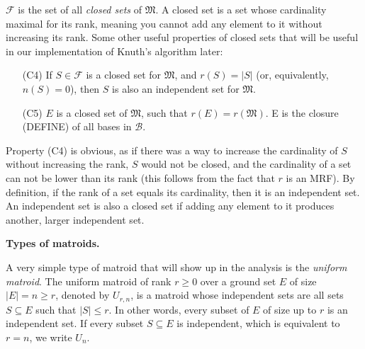 $\mathcal{F}$ is the set of all \textit{closed sets} of $\mathfrak{M}$. A closed set is a set whose cardinality maximal for its rank, meaning you cannot add any element to it without increasing its rank. Some other useful properties of closed sets that will be useful in our implementation of Knuth's algorithm later:

\begin{itemize}
  \item [(C4)] If $S \in \mathcal{F}$ is a closed set for $\mathfrak{M}$, and $r(S) = |S|$ (or, equivalently, $n(S) = 0$), then $S$ is also an independent set for $\mathfrak{M}$.
  \item [(C5)] $E$ is a closed set of $\mathfrak{M}$, such that $r(E) = r(\mathfrak{M})$. E is the closure (DEFINE) of all bases in $\mathcal{B}$.
\end{itemize}

Property (C4) is obvious, as if there was a way to increase the cardinality of $S$ without increasing the rank, $S$ would not be closed, and the cardinality of a set can not be lower than its rank (this follows from the fact that $r$ is an MRF). By definition, if the rank of a set equals its cardinality, then it is an independent set. An independent set is also a closed set if adding any element to it produces another, larger independent set.

\textbf{Types of matroids.} 

A very simple type of matroid that will show up in the analysis is the \textit{uniform matroid}. The uniform matroid of rank $r \geq 0$ over a ground set $E$ of size $|E| = n \geq r$, denoted by $U_{r, n}$, is a matroid whose independent sets are all sets $S \subseteq E$ such that $|S| \leq r$. In other words, every subset of $E$ of size up to $r$ is an independent set. If every subset $S \subseteq E$ is independent, which is equivalent to $r = n$, we write $U_n$.